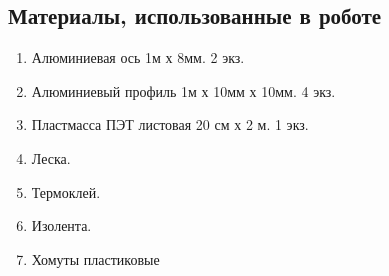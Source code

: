 \subsection{Материалы, использованные в роботе}

\begin{enumerate}
	\item Алюминиевая ось 1м х 8мм. 2 экз.
	\item Алюминиевый профиль 1м х 10мм х 10мм. 4 экз.
	\item Пластмасса ПЭТ листовая 20 см х 2 м. 1 экз.
	\item Леска.
	\item Термоклей.
	\item Изолента.
	\item Хомуты пластиковые
\end{enumerate}
\fillpage
\newpage